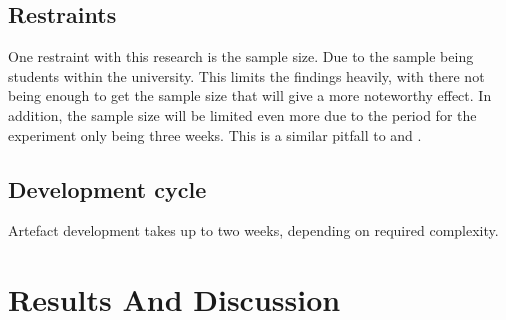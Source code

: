 \documentclass[conference]{IEEEtran}
\begin{document}
\subsection {Restraints}
One restraint with this research is the sample size. Due to the sample being students within the university. This limits the findings heavily, with there not being enough to get the sample size that will give a more noteworthy effect. In addition, the sample size will be limited even more due to the period for the experiment only being three weeks. This is a similar pitfall to \cite{Naaj2021} and \cite{Ruqeyya2022}.\\

\subsection{Development cycle}
Artefact development takes up to two weeks, depending on required complexity.

\section{Results And Discussion}
\begin{table}[H]
\centering
{}
\caption{Table 1 - The data collected from the experiment over two weeks.}
\label{tab:data-table}
\end{table}
\end{document}

